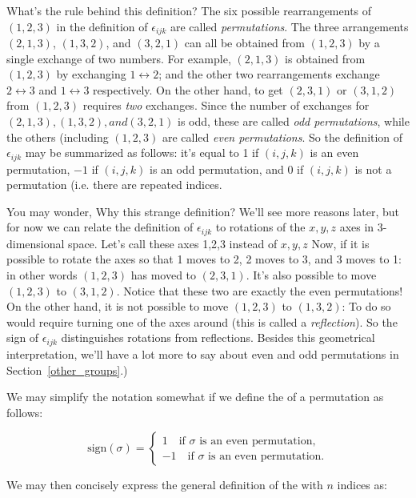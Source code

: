 What's the rule behind this definition?  
The six possible rearrangements of $(1,2,3)$ in the definition of $\epsilon_{ijk}$ are called \emph{permutations}.  
The three arrangements $(2,1,3)$, $(1,3,2)$, and $(3,2,1)$  can all be obtained from $(1,2,3)$ by a single exchange of two numbers.  For example, $(2,1,3)$ is obtained from $(1,2,3)$ by exchanging $1 \leftrightarrow 2$; and the other two rearrangements exchange $2 \leftrightarrow 3$ and $1 \leftrightarrow 3$ respectively.  On the other hand, to get $(2,3,1)$ or $(3,1,2)$ from $(1,2,3)$ requires \emph{two} exchanges.  Since the number of exchanges for $(2,1,3), (1,3,2), and (3,2,1)$ is odd, these are called \emph{odd permutations}, while the others (including $(1,2,3)$  are called \emph{even  permutations}.   So the definition of   $\epsilon_{ijk}$ may be summarized as follows:  it's equal to 1 if $(i,j,k)$ is an even permutation, $-1$ if  $(i,j,k)$ is an odd permutation, and 0 if $(i,j,k)$ is not a permutation (i.e. there are repeated indices.

You may wonder, Why this strange definition?  We'll see more reasons later, but for now we can relate the definition of  $\epsilon_{ijk}$  to rotations of the $x,y,z$ axes in 3-dimensional space. Let's call these axes 1,2,3 instead of $x,y,z$ Now, if it is possible to rotate the axes so that 1 moves to 2, 2 moves to 3, and 3 moves to 1: in other words $(1,2,3)$ has moved to $(2,3,1)$. It's also possible to move $(1,2,3)$ to $(3,1,2)$.  Notice that these two  are exactly the even permutations!  On the other hand, it is not possible to move $(1,2,3)$ to $(1,3,2)$:  To do so would require turning one of the axes around  (this is called a \emph{reflection}). So the sign of   $\epsilon_{ijk}$  distinguishes rotations from reflections. Besides this geometrical interpretation, we'll have a lot more to say about even and odd permutations in Section~\ref{other_groups}.)  

We may simplify the notation somewhat if we define the  of a permutation as follows:

\[ \text{sign}(\sigma)=
\begin{cases}
1 \quad \text{if } \sigma \text{ is an even permutation,}\\
-1 \quad \text{if } \sigma \text{ is an even permutation.}
\end{cases} \]

We may then concisely express the general definition  of the  with $n$ indices as:

